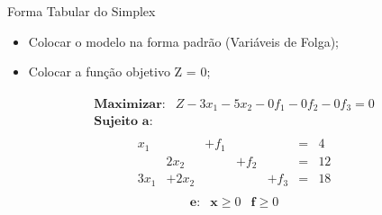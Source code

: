 \documentclass{if-beamer}
\begin{document}
\begin{frame}{Forma Tabular do Simplex}

\begin{itemize}
    \item {} Colocar o modelo na forma padrão (Variáveis de Folga);
    \item {} Colocar a função objetivo Z = 0;
\end{itemize}

\begin{align*}
\begin{matrix}
    \textbf{Maximizar:} & Z - 3x_1 - 5x_2 - 0f_1 - 0f_2 - 0f_3 = 0 \\
    \textbf{Sujeito a:} & 
\end{matrix}
\end{align*}
\vspace{-.6cm}
\begin{align*}
\begin{matrix}
     x_1 &        & + f_1 &       &       & = & 4  \\ 
         &   2x_2 &       & + f_2 &       & = & 12 \\
    3x_1 & + 2x_2 &       &       & + f_3 & = & 18
\end{matrix}
\end{align*}
\begin{align*}
\begin{matrix}
    \textbf{e:} & \mathbf{x} \geq 0 & \mathbf{f} \geq 0
\end{matrix}
\end{align*}

\end{frame}

\end{document}
